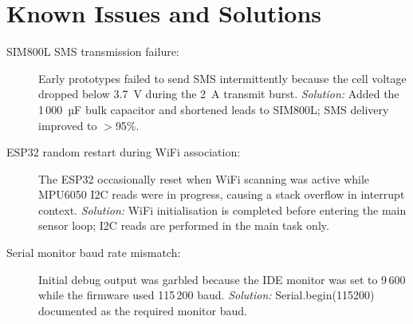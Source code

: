 \section{Known Issues and Solutions}

\begin{description}
  \item[SIM800L SMS transmission failure:]
        Early prototypes failed to send SMS intermittently because the cell voltage
        dropped below 3.7~V during the 2~A transmit burst.
        \textit{Solution:} Added the 1\,000~µF bulk capacitor and shortened leads
        to SIM800L; SMS delivery improved to $>$95\%.

  \item[ESP32 random restart during WiFi association:]
        The ESP32 occasionally reset when WiFi scanning was active while MPU6050 I2C
        reads were in progress, causing a stack overflow in interrupt context.
        \textit{Solution:} WiFi initialisation is completed before entering the main
        sensor loop; I2C reads are performed in the main task only.

  \item[Serial monitor baud rate mismatch:]
        Initial debug output was garbled because the IDE monitor was set to 9\,600 while
        the firmware used 115\,200 baud.
        \textit{Solution:} Serial.begin(115200) documented as the required monitor baud.
\end{description}
